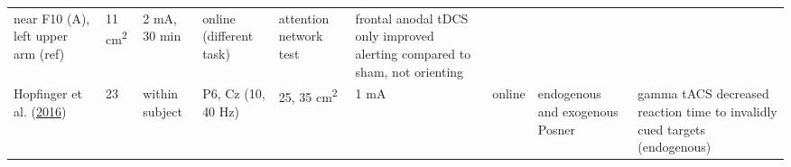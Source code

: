 \documentclass[11pt,]{memoir}
\begin{document}
\begin{longtable}[]{@{}lllllllll@{}}
\begin{minipage}[t]{0.11\columnwidth}
near F10 (A), left upper
arm (ref)\strut
\end{minipage} & \begin{minipage}[t]{0.03\columnwidth}\raggedright
11
cm\textsuperscript{2}\strut
\end{minipage} & \begin{minipage}[t]{0.05\columnwidth}\raggedright
2 mA, 30
min\strut
\end{minipage} & \begin{minipage}[t]{0.05\columnwidth}\raggedright
online
(different
task)\strut
\end{minipage} & \begin{minipage}[t]{0.11\columnwidth}\raggedright
attention network test\strut
\end{minipage} & \begin{minipage}[t]{0.24\columnwidth}\raggedright
frontal anodal tDCS only improved alerting compared to sham,
not orienting\strut
\end{minipage}\tabularnewline
\begin{minipage}[t]{0.12\columnwidth}\raggedright
Hopfinger et al. (\protect\hyperlink{ref-Hopfinger2016}{2016})\strut
\end{minipage} & \begin{minipage}[t]{0.02\columnwidth}\raggedright
23\strut
\end{minipage} & \begin{minipage}[t]{0.04\columnwidth}\raggedright
within
subject\strut
\end{minipage} & \begin{minipage}[t]{0.11\columnwidth}\raggedright
P6, Cz (10, 40 Hz)\strut
\end{minipage} & \begin{minipage}[t]{0.03\columnwidth}\raggedright
25,
35
cm\textsuperscript{2}\strut
\end{minipage} & \begin{minipage}[t]{0.05\columnwidth}\raggedright
1 mA\strut
\end{minipage} & \begin{minipage}[t]{0.05\columnwidth}\raggedright
online\strut
\end{minipage} & \begin{minipage}[t]{0.11\columnwidth}\raggedright
endogenous and exogenous
Posner\strut
\end{minipage} & \begin{minipage}[t]{0.24\columnwidth}\raggedright
gamma tACS decreased reaction time to invalidly cued targets
(endogenous)\strut

\end{minipage}
\end{longtable}
\end{document}
